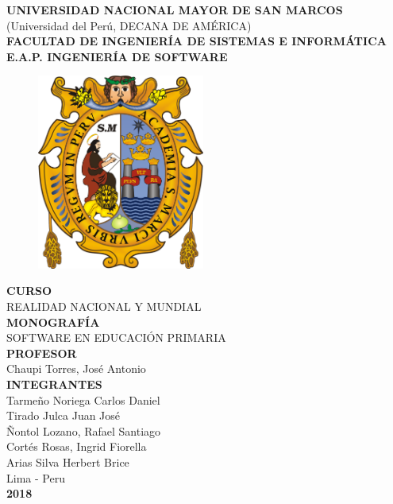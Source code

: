 \documentclass[12pt]{report}
\begin{document}
\begin{titlepage}
   \begin{center}

      {\textbf{\fontsize{0.65cm}{0.65cm}\selectfont UNIVERSIDAD NACIONAL MAYOR DE SAN MARCOS}}\\
      {\large (Universidad del Perú, DECANA DE AMÉRICA)}\\
      \textbf{\Large FACULTAD DE INGENIERÍA DE SISTEMAS E INFORMÁTICA}\\[0.7em]
      \textbf{{\large E.A.P. INGENIERÍA DE SOFTWARE}}

      \begin{figure}[h]
         \begin{center}
            \includegraphics[width=5.5cm]{san_marcos.png}
         \end{center}
      \end{figure}

      \textbf{\Large CURSO}\\[0.7em]
      {\Large REALIDAD NACIONAL Y MUNDIAL}\\
      \vspace{2em}
      \textbf{\Large MONOGRAFÍA}\\[0.7em]
      {\Large SOFTWARE EN EDUCACIÓN PRIMARIA}\\
      \vspace{2em}
      \textbf{\Large PROFESOR}\\[0.7em]
      {\Large Chaupi Torres, José Antonio}\\
      \vspace{2em}
      \textbf{\Large INTEGRANTES}\\[0.7em]
      {\Large Tarmeño Noriega Carlos Daniel}\\[0.5em]
      {\Large Tirado Julca Juan José}\\[0.5em]
      {\Large Ñontol Lozano, Rafael Santiago}\\[0.5em]
      {\Large Cortés Rosas, Ingrid Fiorella}\\[0.5em]
      {\Large Arias Silva Herbert Brice}\\
      \vspace{2em}
      {\Large Lima - Peru}\\[0.7em]
      \textbf{\Large 2018}
   \end{center}
\end{titlepage}
\end{document}
